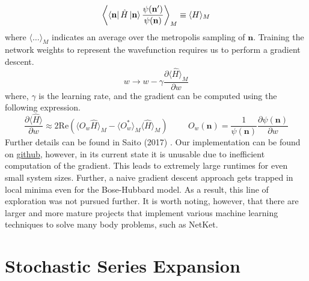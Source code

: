 \begin{equation}
    \left \langle \bra{\mathbf{n}}\hat{H}\ket{\mathbf{n}} \frac{\psi(\mathbf{n}')}{\psi(\mathbf{n})} \right \rangle_M \equiv \langle H \rangle_M    
\end{equation}
where $\langle\dots\rangle_M$ indicates an average over the metropolis sampling of $\mathbf{n}$. Training the network weights to represent the wavefunction requires us to perform a gradient descent.
\begin{equation}
    w \rightarrow w - \gamma \frac{\partial \langle \hat{H} \rangle_M}{\partial w}
\end{equation}
where, $\gamma$ is the learning rate, and the gradient can be computed using the following expression.
\begin{equation}
    \frac{\partial \langle \hat{H} \rangle}{\partial w} \approx 2\text{Re}(\langle O_w \hat{H}\rangle_M - \langle O_w^*\rangle_M\langle\hat{H}\rangle_M) \hspace{1cm} O_w(\mathbf{n}) = \frac{1}{\psi(\mathbf{n})}\frac{\partial \psi(\mathbf{n})}{\partial w}
\end{equation}
Further details can be found in Saito (2017) \cite{Saito_2017}. Our implementation can be found on \href{https://github.com/20akshay00/MSThesis}{github}, however, in its current state it is unusable due to inefficient computation of the gradient. This leads to extremely large runtimes for even small system sizes. Further, a naive gradient descent approach gets trapped in local minima even for the Bose-Hubbard model\cite{Saito_2017}. As a result, this line of exploration was not pursued further. It is worth noting, however, that there are larger and more mature projects that implement various machine learning techniques to solve many body problems, such as NetKet\cite{Vicentini_2022}.

\section{Stochastic Series Expansion}

